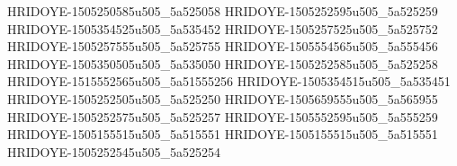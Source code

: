 HRIDOYE-1505250585u505_5a525058
HRIDOYE-1505252595u505_5a525259
HRIDOYE-1505354525u505_5a535452
HRIDOYE-1505257525u505_5a525752
HRIDOYE-1505257555u505_5a525755
HRIDOYE-1505554565u505_5a555456
HRIDOYE-1505350505u505_5a535050
HRIDOYE-1505252585u505_5a525258
HRIDOYE-1515552565u505_5a51555256
HRIDOYE-1505354515u505_5a535451
HRIDOYE-1505252505u505_5a525250
HRIDOYE-1505659555u505_5a565955
HRIDOYE-1505252575u505_5a525257
HRIDOYE-1505552595u505_5a555259
HRIDOYE-1505155515u505_5a515551
HRIDOYE-1505155515u505_5a515551
HRIDOYE-1505252545u505_5a525254
